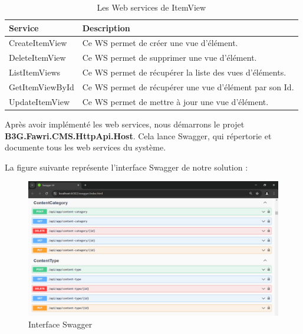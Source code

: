 \begin{table}[H]
    \centering
    \begin{tabular}{|m{5cm}|m{10cm}|}
    \hline
    \textbf{Service} & \textbf{Description} \\
    \hline
CreateItemView & Ce WS permet de créer une vue d'élément.\\
\hline

DeleteItemView & Ce WS permet de supprimer une vue d'élément.\\
\hline

ListItemViews & Ce WS permet de récupérer la liste des vues d'éléments.\\
\hline

GetItemViewById & Ce WS permet de récupérer une vue d'élément par son Id.\\
\hline

UpdateItemView & Ce WS permet de mettre à jour une vue d'élément.\\

    \hline
    \end{tabular}
    \caption{Les Web services de ItemView}
    \label{tab:my_label}
\end{table}



Après avoir implémenté les web services, nous démarrons le projet \textbf{B3G.Fawri.CMS.HttpApi.Host}. Cela lance Swagger, qui répertorie et documente tous les web services du système.

La figure suivante représente l’interface Swagger de notre solution :


\begin{figure}[H] 
    \centering
    \includegraphics[width=18cm]{Figures/swagger apis.PNG}
        \caption{Interface Swagger}
\end{figure}


